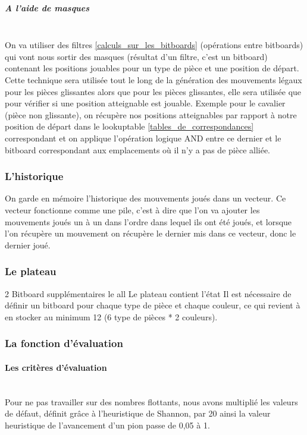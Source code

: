 \huge\documentclass{article}
\begin{document}
    \subparagraph{A l'aide de masques}
    ~~\\
    \newline
    On va utiliser des filtres \ref{calculs_sur_les_bitboards} (opérations entre bitboards) qui vont nous sortir des masques (résultat d'un filtre, c'est un bitboard)
    contenant les positions jouables pour un type de pièce et une position de départ.\newline
    Cette technique sera utilisée tout le long de la génération des mouvements légaux pour les pièces glissantes alors que pour les pièces glissantes, elle sera utilisée que pour vérifier si une position atteignable est jouable.\newline
    Exemple pour le cavalier (pièce non glissante), on récupère nos positions atteignables par rapport à notre position de départ dans le lookuptable \ref{tables_de_correspondances} correspondant et on applique l'opération logique AND entre ce dernier et le bitboard correspondant aux emplacements où il n'y a pas de pièce alliée.

    \subsubsection{L'historique} \label{L'historique}
    On garde en mémoire l'historique des mouvements joués dans un vecteur.\newline
    Ce vecteur fonctionne comme une pile, c'est à dire que l'on va ajouter les mouvements joués un à un dans l'ordre dans lequel ils ont été joués, et lorsque l'on récupère un mouvement on récupère le dernier mis dans ce vecteur, donc le dernier joué.


    \subsubsection{Le plateau} \label{implementation_plateau}
    2 Bitboard supplémentaires le all
    Le plateau contient l'état
    Il est nécessaire de définir un bitboard pour chaque type de pièce et chaque couleur, ce qui revient à en stocker au minimum 12 (6 type de pièces * 2 couleurs).

    \subsubsection{La fonction d'évaluation}\label{heuristique_architecture}
    \paragraph{Les critères d'évaluation}
    ~~\\
    Pour ne pas travailler sur des nombres flottants, nous avons multiplié les valeurs de défaut, définit grâce à l'heuristique de Shannon, par 20 ainsi la valeur heuristique de l'avancement d'un pion passe de 0,05 à 1.
\end{document}
